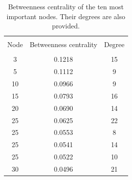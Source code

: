 \documentclass[11pt, english]{article}
\begin{document}
\begin{multicols}{2}
\begin{table}
	\caption{Betweenness centrality of the ten most important nodes. Their degrees are also provided.}
	\label{tab:betweenness-centrality}
	\centering
	\begin{tabular}{ccc}
		\hline\hline
		\\[-1.5ex]
		Node	&	Betweenness centrality	&	Degree	\\[0.5ex]\hline
		\\[-1.5ex]
		3		&	0.1218					&	15		\\[0.2ex]
		5		&	0.1112					&	9		\\[0.2ex]
		10		&	0.0966					&	9		\\[0.2ex]
		15		&	0.0793					&	16		\\[0.2ex]
		20		&	0.0690					&	14		\\[0.2ex]
		25		&	0.0625					&	22		\\[0.2ex]
		25		&	0.0553					&	8		\\[0.2ex]
		25		&	0.0541					&	14		\\[0.2ex]
		25		&	0.0522					&	10		\\[0.2ex]
		30		&	0.0496					&	21		\\[0.5ex]
		\hline\hline
	\end{tabular}
\end{table}

\end{multicols}
\end{document}

